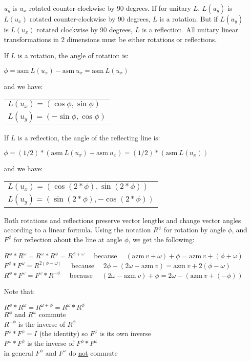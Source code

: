 \documentclass[12pt]{article}
\begin{document}
$u_y$ is $u_x$ rotated counter-clockwise by 90 degrees.
If for unitary $L$, $L(u_y)$ is $L(u_x)$ rotated counter-clockwise
by 90 degrees, $L$ is a rotation.
But if $L(u_y)$ is $L(u_x)$ rotated clockwise
by 90 degrees, $L$ is a reflection.  All unitary linear transformations
in 2 dimensions must be either rotations or reflections.

If $L$ is a rotation, the angle of rotation is: \\
\centerline{$\phi = \mathrm{asm}~L(u_x) - \mathrm{asm}~u_x =
             \mathrm{asm}~L(u_x)$}
and we have: \begin{tabular}[t]{l}
             $L(u_x)=(\cos\phi,\sin\phi)$ \\
             $L(u_y)=(-\sin\phi,\cos\phi)$ \\
	     \end{tabular}

If $L$ is a reflection, the angle of the reflecting line is: \\
\centerline{$\phi = (1/2)*(\mathrm{asm}~L(u_x) + \mathrm{asm}~u_x)
                  = (1/2)*(\mathrm{asm}~L(u_x))$}
and we have: \begin{tabular}[t]{l}
             $L(u_x)=(\cos(2*\phi),\sin(2*\phi))$ \\
             $L(u_y)=(\sin(2*\phi),-\cos(2*\phi))$ \\
	     \end{tabular}

Both rotations and reflections preserve vector lengths
and change vector angles according to a linear formula.
Using the notation $R^\phi$ for rotation by angle $\phi$,
and $F^\phi$ for reflection about the line at angle $\phi$,
we get the following:
\begin{center}
$R^\phi*R^\omega=R^\omega*R^\phi=R^{\phi+\omega}$
~~because~~
    $(\mathrm{azm}~v + \omega) + \phi = \mathrm{azm}~v + (\phi+\omega)$ \\
$F^\phi*F^\omega = R^{2(\phi-\omega)}$
~~because~~
    $2\phi - (2\omega - \mathrm{azm}~v) = \mathrm{azm}~v + 2(\phi-\omega)$ \\
$R^\phi*F^\omega = F^\omega*R^{-\phi}$
~~because~~
    $(2\omega - \mathrm{azm}~v) + \phi =
      2\omega - (\mathrm{azm}~v + (-\phi))$
\end{center}
Note that:
\begin{center}
$R^\phi*R^\omega=R^{\omega+\phi}=R^\omega*R^\phi$ \\
$R^\phi$ and $R^\omega$ commute \\
$R^{-\phi}$ is the inverse of $R^\phi$ \\
$F^\phi*F^\phi= I$ (the identity) so  $F^\phi$ is its own inverse \\
$F^\omega*F^\phi$ is the inverse of $F^\phi*F^\omega$ \\
in general $F^\phi$ and $F^\omega$ do \underline{not} commute\\
\end{center}
\end{document}
